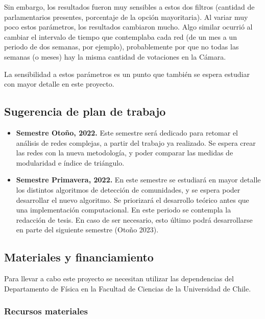\documentclass{proyectotesis}
\begin{document}
Sin embargo, los resultados fueron muy sensibles a estos dos filtros (cantidad de parlamentarios presentes, porcentaje de la opción mayoritaria). Al variar muy poco estos parámetros, los resultados cambiaron mucho. Algo similar ocurrió al cambiar el intervalo de tiempo que contemplaba cada red (de un mes a un periodo de dos semanas, por ejemplo), probablemente por que no todas las semanas (o meses) hay la misma cantidad de votaciones en la Cámara. 

La sensibilidad a estos parámetros es un punto que también se espera estudiar con mayor detalle en este proyecto. 



\subsection{Sugerencia de plan de trabajo}
\begin{itemize}
\item \textbf{Semestre Otoño, 2022.} Este semestre será dedicado para retomar el análisis de redes complejas, a partir del trabajo ya realizado. Se espera crear las redes con la nueva metodología, y poder comparar las medidas de modularidad e índice de triángulo.

\item \textbf{Semestre Primavera, 2022.} En este semestre se estudiará en mayor detalle los distintos algoritmos de detección de comunidades, y se espera poder desarrollar el nuevo algoritmo. Se priorizará el desarrollo teórico antes que una implementación computacional.
En este periodo se contempla la redacción de tesis. En caso de ser necesario, esto último podrá desarrollarse en parte del siguiente semestre (Otoño 2023). 
\end{itemize}

\subsection{Materiales y financiamiento}

Para llevar a cabo este proyecto se necesitan utilizar las dependencias del Departamento de Física en la Facultad de Ciencias de la Universidad de Chile. %

\subsubsection*{Recursos materiales}
\end{document}
